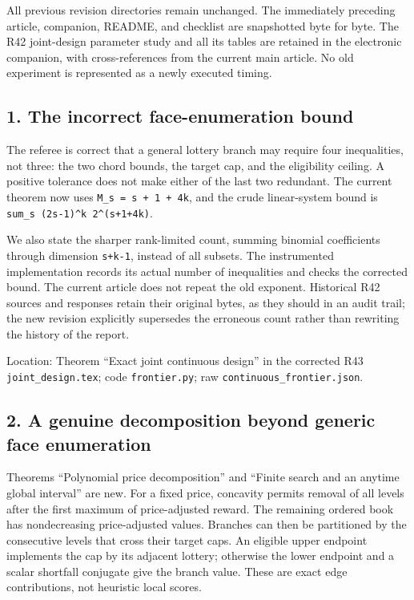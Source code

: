 \documentclass[11pt,letterpaper]{article}
\begin{document}
All previous revision directories remain unchanged. The immediately preceding article, companion, README, and checklist are snapshotted byte for byte. The R42 joint-design parameter study and all its tables are retained in the electronic companion, with cross-references from the current main article. No old experiment is represented as a newly executed timing.



\subsection*{1. The incorrect face-enumeration bound}


The referee is correct that a general lottery branch may require four inequalities, not three: the two chord bounds, the target cap, and the eligibility ceiling. A positive tolerance does not make either of the last two redundant. The current theorem now uses \texttt{M\_s = s + 1 + 4k}, and the crude linear-system bound is \texttt{sum\_s (2s-1)\textasciicircum{}k 2\textasciicircum{}(s+1+4k)}.



We also state the sharper rank-limited count, summing binomial coefficients through dimension \nolinkurl{s+k-1}, instead of all subsets. The instrumented implementation records its actual number of inequalities and checks the corrected bound. The current article does not repeat the old exponent. Historical R42 sources and responses retain their original bytes, as they should in an audit trail; the new revision explicitly supersedes the erroneous count rather than rewriting the history of the report.



Location: Theorem “Exact joint continuous design” in the corrected R43 \nolinkurl{joint_design.tex}; code \nolinkurl{frontier.py}; raw \nolinkurl{continuous_frontier.json}.



\subsection*{2. A genuine decomposition beyond generic face enumeration}


Theorems “Polynomial price decomposition” and “Finite search and an anytime global interval” are new. For a fixed price, concavity permits removal of all levels after the first maximum of price-adjusted reward. The remaining ordered book has nondecreasing price-adjusted values. Branches can then be partitioned by the consecutive levels that cross their target caps. An eligible upper endpoint implements the cap by its adjacent lottery; otherwise the lower endpoint and a scalar shortfall conjugate give the branch value. These are exact edge contributions, not heuristic local scores.
\end{document}
